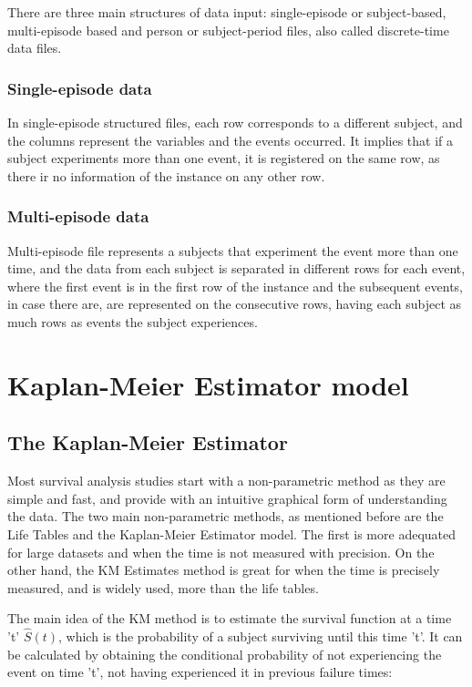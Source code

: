 \documentclass[11pt]{book} %
\begin{document}
      There are three main structures of data input: single-episode or subject-based, multi-episode based and person or subject-period files, also called discrete-time data files.

      \subsubsection{Single-episode data}

        In single-episode structured files, each row corresponds to a different subject, and the columns represent the variables and the events occurred. It implies that if a subject experiments more than one event, it is registered on the same row, as there ir no information of the instance on any other row.

      \subsubsection{Multi-episode data}

        Multi-episode file represents a subjects that experiment the event more than one time, and the data from each subject is separated in different rows for each event, where the first event is in the first row of the instance and the subsequent events, in case there are, are represented on the consecutive rows, having each subject as much rows as events the subject experiences.

  \section{Kaplan-Meier Estimator model}

    \subsection{The Kaplan-Meier Estimator}


    Most survival analysis studies start with a non-parametric method as they are simple and fast, and provide with an intuitive graphical form of understanding the data. The two main non-parametric methods, as mentioned before are the Life Tables and the Kaplan-Meier Estimator model. The first is more adequated for large datasets and when the time is not measured with precision. On the other hand, the KM Estimates method is great for when the time is precisely measured, and is widely used, more than the life tables.

    The main idea of the KM method is to estimate the survival function at a time 't' $\widehat{S}(t)$, which is the probability of a subject surviving until this time 't'. It can be calculated by obtaining the conditional probability of not experiencing the event on time 't', not having experienced it in previous failure times:
\end{document}
